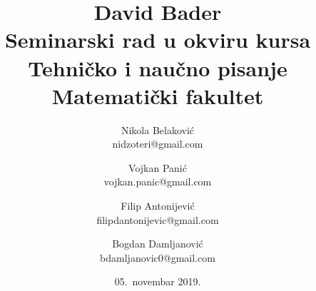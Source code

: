 \documentclass[a4paper]{article}
\begin{document}
\title{David Bader\\ \small{Seminarski rad u okviru kursa\\Tehničko i naučno pisanje\\ Matematički fakultet}}

\author{Nikola Belaković \\ nidzoteri@gmail.com \and
 Vojkan Panić \\ vojkan.panic@gmail.com \and
 Filip Antonijević \\ filipdantonijevic@gmail.com \and
 Bogdan Damljanović \\  bdamljanovic0@gmail.com } 	
\date{05.~novembar 2019.}


\maketitle
\end{document}
